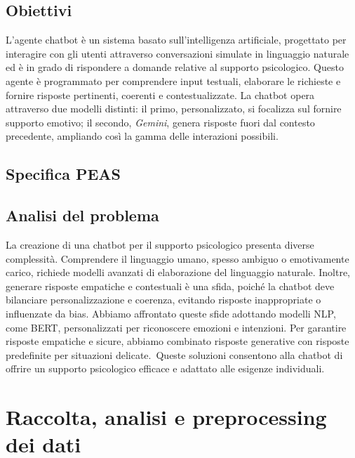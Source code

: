 \documentclass[12pt, letterpaper]{article}
\begin{document}
\subsection{Obiettivi}
L'agente chatbot è un sistema basato sull'intelligenza artificiale, progettato per interagire con gli utenti attraverso conversazioni simulate in linguaggio naturale ed è in grado di rispondere a domande relative al supporto psicologico. Questo agente è programmato per comprendere input testuali, elaborare le richieste e fornire risposte pertinenti, coerenti e contestualizzate.
La chatbot opera attraverso due modelli distinti: il primo, personalizzato, si focalizza sul fornire supporto emotivo; il secondo, \textit{Gemini}, genera risposte fuori dal contesto precedente, ampliando così la gamma delle interazioni possibili.

\subsection{Specifica PEAS}
\subsection{Analisi del problema}
La creazione di una chatbot per il supporto psicologico presenta diverse complessità. Comprendere il linguaggio umano, spesso ambiguo o emotivamente carico, richiede modelli avanzati di elaborazione del linguaggio naturale. Inoltre, generare risposte empatiche e contestuali è una sfida, poiché la chatbot deve bilanciare personalizzazione e coerenza, evitando risposte inappropriate o influenzate da bias. Abbiamo affrontato queste sfide adottando modelli NLP, come BERT, personalizzati per riconoscere emozioni e intenzioni. Per garantire risposte empatiche e sicure, abbiamo combinato risposte generative con risposte predefinite per situazioni delicate.\ Queste soluzioni consentono alla chatbot di offrire un supporto psicologico efficace e adattato alle esigenze individuali.

\section{Raccolta, analisi e preprocessing dei dati}
\end{document}
